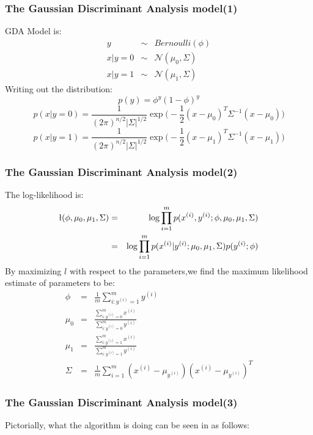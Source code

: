\documentclass[slidestop,compress,mathserif]{beamer}
\begin{document}
    \begin{frame}[shrink]
        \frametitle{The Gaussian Discriminant Analysis model(1)}
        GDA Model is:
        \begin{eqnarray*}
            y &\sim& Bernoulli(\phi)\\
            x|y=0 &\sim& \mathcal{N}(\mu_0,\Sigma)\\
            x|y=1 &\sim& \mathcal{N}(\mu_1,\Sigma)
        \end{eqnarray*}
        Writing out the distribution:
        $$p(y)=\phi^y(1-\phi)^y$$
        $$p(x|y=0) = \frac{1}{(2\pi)^{n/2}|\Sigma|^{1/2}}\exp\bigg( -\frac{1}{2}(x-\mu_0)^T\Sigma^{-1}(x-\mu_0)\bigg)$$
        $$p(x|y=1) = \frac{1}{(2\pi)^{n/2}|\Sigma|^{1/2}}\exp\bigg( -\frac{1}{2}(x-\mu_1)^T\Sigma^{-1}(x-\mu_1)\bigg)$$

    \end{frame}
    \begin{frame}[shrink]
        \frametitle{The Gaussian Discriminant Analysis model(2)}
        The log-likelihood is:
        \begin{eqnarray*}
            \l(\phi,\mu_0,\mu_1,\Sigma) &=& \log\prod_{i=1}^mp(x^{(i)},y^{(i)};\phi,\mu_0,\mu_1,\Sigma)\\
            &=& \log \prod_{i=1}^mp(x^{(i)}|y^{(i)};\mu_0,\mu_1,\Sigma)p(y^{(i)};\phi)
        \end{eqnarray*}
        By maximizing $l$ with respect to the parameters,we find the maximum likelihood estimate of parameters to be:
        \begin{eqnarray*}
            \phi &=& \frac{1}{m}\sum_{i:y^{(i)}=1}^my^{(i)}\\
            \mu_0 &=& \frac{\sum_{i:y^{(i)}=0}^mx^{(i)}}{\sum_{i:y^{(i)}=0}^my^{(i)}}\\
            \mu_1 &=&
            \frac{\sum_{i:y^{(i)}=1}^mx^{(i)}}{\sum_{i:y^{(i)}=1}^my^{(i)}}\\
            \Sigma &=& \frac{1}{m}\sum_{i=1}^m(x^{(i)}-\mu_{y^{(i)}})(x^{(i)}-\mu_{y^{(i)}})^T
        \end{eqnarray*}
    \end{frame}
    \begin{frame}[shrink]
        \frametitle{The Gaussian Discriminant Analysis model(3)}
        Pictorially, what the algorithm is doing can be seen in as follows:
        \begin{figure}
        \end{figure}
    \end{frame}
\end{document}
